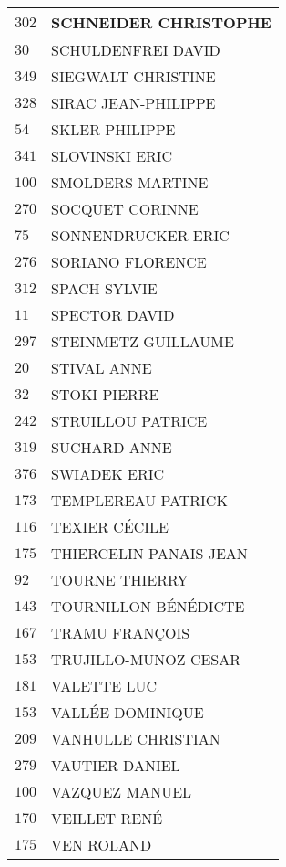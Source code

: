 \begin{xltabular}{\linewidth}{|l|X|}
    \hline
    $302$ & SCHNEIDER CHRISTOPHE \\
    \hline
    $30$ & SCHULDENFREI DAVID \\
    \hline
    $349$ & SIEGWALT CHRISTINE \\
    \hline
    $328$ & SIRAC JEAN-PHILIPPE \\
    \hline
    $54$ & SKLER PHILIPPE \\
    \hline
    $341$ & SLOVINSKI ERIC \\
    \hline
    $100$ & SMOLDERS MARTINE \\
    \hline
    $270$ & SOCQUET CORINNE \\
    \hline
    $75$ & SONNENDRUCKER ERIC \\
    \hline
    $276$ & SORIANO FLORENCE \\
    \hline
    $312$ & SPACH SYLVIE \\
    \hline
    $11$ & SPECTOR DAVID \\
    \hline
    $297$ & STEINMETZ GUILLAUME \\
    \hline
    $20$ & STIVAL ANNE \\
    \hline
    $32$ & STOKI PIERRE \\
    \hline
    $242$ & STRUILLOU PATRICE \\
    \hline
    $319$ & SUCHARD ANNE \\
    \hline
    $376$ & SWIADEK ERIC \\
    \hline
    $173$ & TEMPLEREAU PATRICK \\
    \hline
    $116$ & TEXIER CÉCILE \\
    \hline
    $175$ & THIERCELIN PANAIS JEAN \\
    \hline
    $92$ & TOURNE THIERRY \\
    \hline
    $143$ & TOURNILLON BÉNÉDICTE \\
    \hline
    $167$ & TRAMU FRANÇOIS \\
    \hline
    $153$ & TRUJILLO-MUNOZ CESAR \\
    \hline
    $181$ & VALETTE LUC \\
    \hline
    $153$ & VALLÉE DOMINIQUE \\
    \hline
    $209$ & VANHULLE CHRISTIAN \\
    \hline
    $279$ & VAUTIER DANIEL \\
    \hline
    $100$ & VAZQUEZ MANUEL \\
    \hline
    $170$ & VEILLET RENÉ \\
    \hline
    $175$ & VEN ROLAND \\

\end{xltabular}
